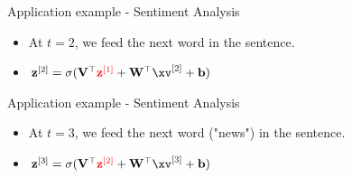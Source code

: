 \begin{frame} {Application example - Sentiment Analysis}
  \begin{itemize}
    \item At $t = 2$, we feed the next word in the sentence.
    \item $\mathbf{z}^{[2]} = \sigma(\mathbf{V}^\top\textcolor{red}{\mathbf{z}^{[1]}} + \mathbf{W}^\top \xv^{[2]} + \mathbf{b})$
  \end{itemize}
  \begin{figure}
      \centering
  \end{figure}
\end{frame}

\begin{frame} {Application example - Sentiment Analysis}
  \begin{itemize}
    \item At $t = 3$, we feed the next word ("news") in the sentence.
    \item $\mathbf{z}^{[3]} = \sigma(\mathbf{V}^\top\textcolor{red}{\mathbf{z}^{[2]}} + \mathbf{W}^\top \xv^{[3]} + \mathbf{b})$
  \end{itemize}
  \begin{figure}
      \centering
  \end{figure}
\end{frame}

